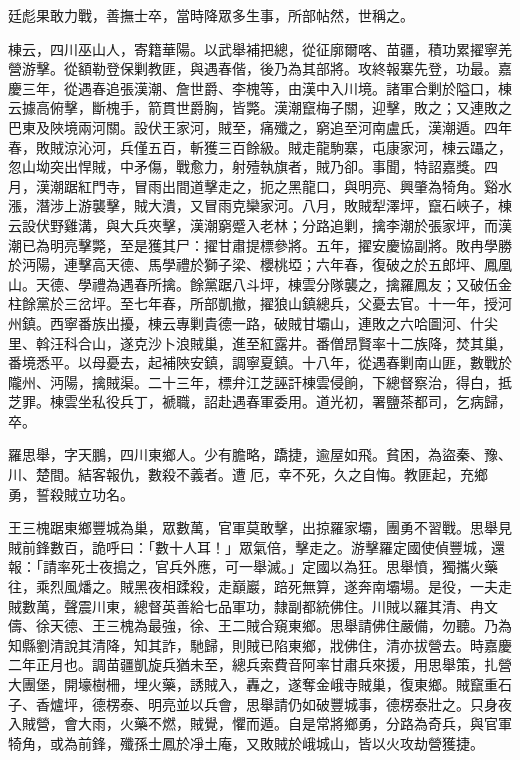 \begin{pinyinscope}
廷彪果敢力戰，善撫士卒，當時降眾多生事，所部帖然，世稱之。

棟云，四川巫山人，寄籍華陽。以武舉補把總，從征廓爾喀、苗疆，積功累擢寧羌營游擊。從額勒登保剿教匪，與遇春偕，後乃為其部將。攻終報寨先登，功最。嘉慶三年，從遇春追張漢潮、詹世爵、李槐等，由漢中入川境。諸軍合剿於隘口，棟云據高俯擊，斷槐手，箭貫世爵胸，皆斃。漢潮竄梅子關，迎擊，敗之；又連敗之巴東及陜境兩河關。設伏王家河，賊至，痛殲之，窮追至河南盧氏，漢潮遁。四年春，敗賊涼沁河，兵僅五百，斬獲三百餘級。賊走龍駒寨，屯康家河，棟云躡之，忽山坳突出悍賊，中矛傷，戰愈力，射殪執旗者，賊乃卻。事聞，特詔嘉獎。四月，漢潮踞紅門寺，冒雨出間道擊走之，扼之黑龍口，與明亮、興肇為犄角。谿水漲，潛涉上游襲擊，賊大潰，又冒雨克欒家河。八月，敗賊犁澤坪，竄石峽子，棟云設伏野雞溝，與大兵夾擊，漢潮窮蹙入老林；分路追剿，擒李潮於張家坪，而漢潮已為明亮擊斃，至是獲其尸：擢甘肅提標參將。五年，擢安慶協副將。敗冉學勝於沔陽，連擊高天德、馬學禮於獅子梁、櫻桃埡；六年春，復破之於五郎坪、鳳凰山。天德、學禮為遇春所擒。餘黨踞八斗坪，棟雲分隊襲之，擒羅鳳友；又破伍金柱餘黨於三岔坪。至七年春，所部凱撤，擢狼山鎮總兵，父憂去官。十一年，授河州鎮。西寧番族出擾，棟云專剿貴德一路，破賊甘壩山，連敗之六哈圖河、什尖里、斡汪科合山，遂克沙卜浪賊巢，進至紅露井。番僧昂賢率十二族降，焚其巢，番境悉平。以母憂去，起補陜安鎮，調寧夏鎮。十八年，從遇春剿南山匪，數戰於隴州、沔陽，擒賊渠。二十三年，標弁江芝誣訐棟雲侵餉，下總督察治，得白，抵芝罪。棟雲坐私役兵丁，褫職，詔赴遇春軍委用。道光初，署鹽茶都司，乞病歸，卒。

羅思舉，字天鵬，四川東鄉人。少有膽略，蹻捷，逾屋如飛。貧困，為盜秦、豫、川、楚間。結客報仇，數殺不義者。遭厄，幸不死，久之自悔。教匪起，充鄉勇，誓殺賊立功名。

王三槐踞東鄉豐城為巢，眾數萬，官軍莫敢擊，出掠羅家壩，團勇不習戰。思舉見賊前鋒數百，詭呼曰：「數十人耳！」眾氣倍，擊走之。游擊羅定國使偵豐城，還報：「請率死士夜搗之，官兵外應，可一舉滅。」定國以為狂。思舉憤，獨攜火藥往，乘烈風燔之。賊黑夜相蹂殺，走巔巖，踣死無算，遂奔南壩場。是役，一夫走賊數萬，聲震川東，總督英善給七品軍功，隸副都統佛住。川賊以羅其清、冉文儔、徐天德、王三槐為最強，徐、王二賊合窺東鄉。思舉請佛住嚴備，勿聽。乃為知縣劉清說其清降，知其詐，馳歸，則賊已陷東鄉，戕佛住，清亦拔營去。時嘉慶二年正月也。調苗疆凱旋兵猶未至，總兵索費音阿率甘肅兵來援，用思舉策，扎營大團堡，開壕樹柵，埋火藥，誘賊入，轟之，遂奪金峨寺賊巢，復東鄉。賊竄重石子、香爐坪，德楞泰、明亮並以兵會，思舉請仍如破豐城事，德楞泰壯之。只身夜入賊營，會大雨，火藥不燃，賊覺，懼而遁。自是常將鄉勇，分路為奇兵，與官軍犄角，或為前鋒，殲孫士鳳於凈土庵，又敗賊於峨城山，皆以火攻劫營獲捷。


\end{pinyinscope}
